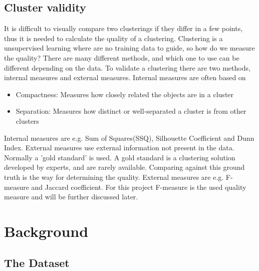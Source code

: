 \documentclass[a4paper,10pt]{article}
\theoremstyle{plain}
\theoremstyle{definition}
\begin{document}
\subsection{Cluster validity}
It is difficult to visually compare two clusterings if they differ in a few points, thus it is needed to calculate the quality of a clustering. Clustering is a unsupervised learning where are no training data to guide, so how do we measure the quality? There are many different methods, and which one to use can be different depending on the data.
To validate a clustering there are two methods, internal measures and external measures. Internal measures are often based on
\begin{itemize}
	\item Compactness: Measures how closely related the objects are in a cluster
	\item Separation: Measures how distinct or well-separated a cluster is from other clusters
\end{itemize}
Internal measures are e.g. Sum of Squares(SSQ), Silhouette Coefficient and Dunn Index. External measures use external information not present in the data. Normally a 'gold standard' is used. A gold standard is a clustering solution developed by experts, and are rarely available. Comparing against this ground truth is the way for determining the quality. External measures are e.g. F-measure and Jaccard coefficient. For this project F-measure is the used quality measure and will be further discussed later.


\newpage
\section{Background}

\subsection{The Dataset}
\end{document}
